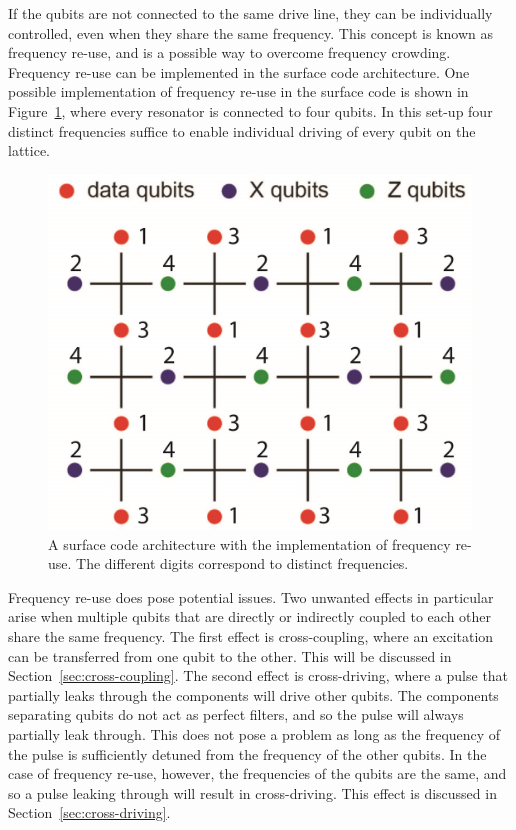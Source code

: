       If the qubits are not connected to the same drive line, they can be individually controlled, even when they share the same frequency. This concept is known as frequency re-use, and is a possible way to overcome frequency crowding. Frequency re-use can be implemented in the surface code architecture. One possible implementation of frequency re-use in the surface code is shown in Figure~\ref{fig:surface code frequency re-use}, where every resonator is connected to four qubits. In this set-up four distinct frequencies suffice to enable individual driving of every qubit on the lattice.

      \begin{figure}[h]
        \centering
        \includegraphics[width=.6\textwidth]{../Figures/Exploring frequency re-use/surface_code_frequency re-use_cut.jpg}
        \caption{A surface code architecture with the implementation of frequency re-use. The different digits correspond to distinct frequencies. }
        \label{fig:surface code frequency re-use}
      \end{figure}

      Frequency re-use does pose potential issues. Two unwanted effects in particular arise when multiple qubits that are directly or indirectly coupled to each other share the same frequency. The first effect is cross-coupling, where an excitation can be transferred from one qubit to the other. This will be discussed in Section~\ref{sec:cross-coupling}. The second effect is cross-driving, where a pulse that partially leaks through the components will drive other qubits. The components separating qubits do not act as perfect filters, and so the pulse will always partially leak through. This does not pose a problem as long as the frequency of the pulse is sufficiently detuned from the frequency of the other qubits. In the case of frequency re-use, however, the frequencies of the qubits are the same, and so a pulse leaking through will result in cross-driving. This effect is discussed in Section~\ref{sec:cross-driving}.

